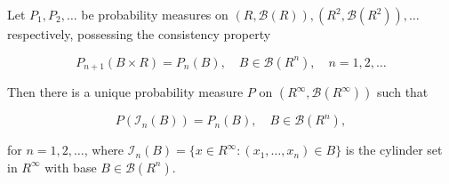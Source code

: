 Let $P_1, P_2, \ldots$ be probability measures on $(R, \mathcal{B}(R)), (R^2, \mathcal{B}(R^2)), \ldots$ respectively, possessing the consistency property

$$P_{n+1}(B \times R) = P_n(B), \quad B \in \mathcal{B}(R^n), \quad n = 1, 2, \ldots$$

Then there is a unique probability measure $P$ on $(R^\infty, \mathcal{B}(R^\infty))$ such that

$$P(\mathcal{I}_n(B)) = P_n(B), \quad B \in \mathcal{B}(R^n),$$

for $n = 1, 2, \ldots$, where $\mathcal{I}_n(B) = \{x \in R^\infty : (x_1, \ldots, x_n) \in B\}$ is the cylinder set in $R^\infty$ with base $B \in \mathcal{B}(R^n)$.
